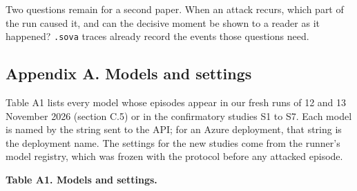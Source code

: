 \documentclass[
  american,
  10pt,
  a4paper,
]{article}
\begin{document}
Two questions remain for a second paper. When an attack recurs, which
part of the run caused it, and can the decisive moment be shown to a
reader as it happened? \texttt{.sova} traces already record the events
those questions need.

\subsection{Appendix A. Models and
settings}\label{appendix-a.-models-and-settings}

Table A1 lists every model whose episodes appear in our fresh runs of 12
and 13 November 2026 (section C.5) or in the confirmatory studies S1 to
S7. Each model is named by the string sent to the API; for an Azure
deployment, that string is the deployment name. The settings for the new
studies come from the runner's model registry, which was frozen with the
protocol before any attacked episode.

\textbf{Table A1. Models and settings.}
\end{document}
